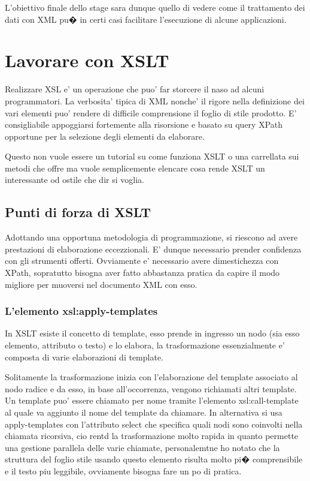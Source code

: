 \documentclass[11pt,titlepage,a4paper,twoside,openany]{book}
\begin{document}
L'obiettivo finale dello stage sara dunque quello di vedere come il trattamento dei dati con XML pu� in certi casi facilitare l'esecuzione di alcune applicazioni.



\chapter{Lavorare con XSLT}
Realizzare XSL e' un operazione che puo' far storcere il naso ad alcuni programmatori.
La verbosita' tipica di XML nonche' il rigore nella definizione dei vari elementi puo' rendere di difficile comprensione il foglio di stile prodotto.
E' consigliabile appoggiarsi fortemente alla risorsione e basato su query XPath opportune per la selezione degli elementi da elaborare.

Questo non vuole essere un tutorial su come funziona XSLT o una carrellata sui metodi che offre ma vuole semplicemente elencare cosa rende XSLT un interessante od ostile che dir si voglia.

\section{Punti di forza di XSLT}
Adottando una opportuna metodologia di programmazione, si riescono ad avere prestazioni di elaborazione eccezzionali. E' dunque necessario prender confidenza con gli strumenti offerti.
Ovviamente e' necessario avere dimestichezza con XPath, sopratutto bisogna aver fatto abbastanza pratica da capire il modo migliore per muoversi nel documento XML con esso.

\subsection{L'elemento xsl:apply-templates}
In XSLT esiste il concetto di template, esso prende in ingresso un nodo (sia esso elemento, attributo o testo) e lo elabora, la trasformazione essenzialmente e' composta di varie elaborazioni di template.

Solitamente la trasformazione inizia con l'elaborazione del template associato al nodo radice e da esso, in base all'occorrenza, vengono richiamati altri template. Un template puo' essere chiamato per nome tramite l'elemento xsl:call-template al quale va aggiunto il nome del template da chiamare. In alternativa si usa apply-templates con l'attributo select che specifica quali nodi sono coinvolti nella chiamata ricorsiva, cio rentd la trasformazione molto rapida in quanto permette una gestione parallela delle varie chiamate, personalemtne ho notato che la struttura del foglio stile usando questo elemento risulta molto pi� comprensibile e il testo piu leggibile, ovviamente bisogna fare un po di pratica.
\end{document}
